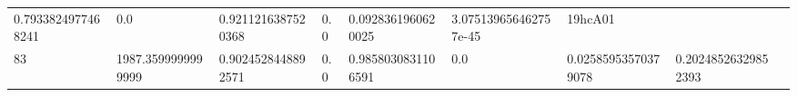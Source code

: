 \documentclass[11pt,a4paper,twoside]{book}
\theoremstyle{definition}
\theoremstyle{definition}
\theoremstyle{remark}
\begin{document}
\begin{longtable}[]{@{}lllllllll@{}}
\begin{minipage}[t]{0.04\columnwidth}
0.7933824977468241\strut
\end{minipage} & \begin{minipage}[t]{0.04\columnwidth}\raggedright\strut
0.0\strut
\end{minipage} & \begin{minipage}[t]{0.04\columnwidth}\raggedright\strut
0.9211216387520368\strut
\end{minipage} & \begin{minipage}[t]{0.04\columnwidth}\raggedright\strut
0.0\strut
\end{minipage} & \begin{minipage}[t]{0.04\columnwidth}\raggedright\strut
0.0928361960620025\strut
\end{minipage} & \begin{minipage}[t]{0.04\columnwidth}\raggedright\strut
3.075139656462757e-45\strut
\end{minipage} & \begin{minipage}[t]{0.04\columnwidth}\raggedright\strut
19hcA01\strut
\end{minipage}\tabularnewline
\begin{minipage}[t]{0.04\columnwidth}\raggedright\strut
83\strut
\end{minipage} & \begin{minipage}[t]{0.04\columnwidth}\raggedright\strut
1987.3599999999999\strut
\end{minipage} & \begin{minipage}[t]{0.04\columnwidth}\raggedright\strut
0.9024528448892571\strut
\end{minipage} & \begin{minipage}[t]{0.04\columnwidth}\raggedright\strut
0.0\strut
\end{minipage} & \begin{minipage}[t]{0.04\columnwidth}\raggedright\strut
0.9858030831106591\strut
\end{minipage} & \begin{minipage}[t]{0.04\columnwidth}\raggedright\strut
0.0\strut
\end{minipage} & \begin{minipage}[t]{0.04\columnwidth}\raggedright\strut
0.02585953570379078\strut
\end{minipage} & \begin{minipage}[t]{0.04\columnwidth}\raggedright\strut
0.20248526329852393\strut
\end{minipage} & \begin{minipage}[t]{0.04\columnwidth}\raggedright\strut

\end{minipage}
\end{longtable}
\end{document}
